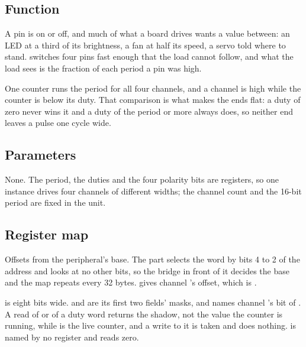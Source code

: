 
%
{}

\subsection*{Function}

A pin is on or off, and much of what a board drives wants a value
between: an LED at a third of its brightness, a fan at half its speed, a
servo told where to stand.  switches four pins fast enough
that the load cannot follow, and what the load sees is the fraction of
each period a pin was high.

One counter runs the period for all four channels, and a channel is
high while the counter is below its duty. That comparison is what makes
the ends flat: a duty of zero never wins it and a duty of the period or
more always does, so neither end leaves a pulse one cycle wide.

\subsection*{Parameters}

None. The period, the duties and the four polarity bits are registers,
so one instance drives four channels of different widths; the channel
count and the 16-bit period are fixed in the unit.

\subsection*{Register map}

Offsets from the peripheral's base. The part selects the word by bits 4
to 2 of the address and looks at no other bits, so the bridge in front
of it decides the base and the map repeats every 32 bytes.
 gives channel 's offset, which is
.


 is eight bits wide.  and
 are its first two fields' masks, and
 names channel 's bit of . A
read of  or of a duty word returns the shadow, not the
value the counter is running, while  is the live counter,
and a write to it is taken and does nothing.  is named by no
register and reads zero.

